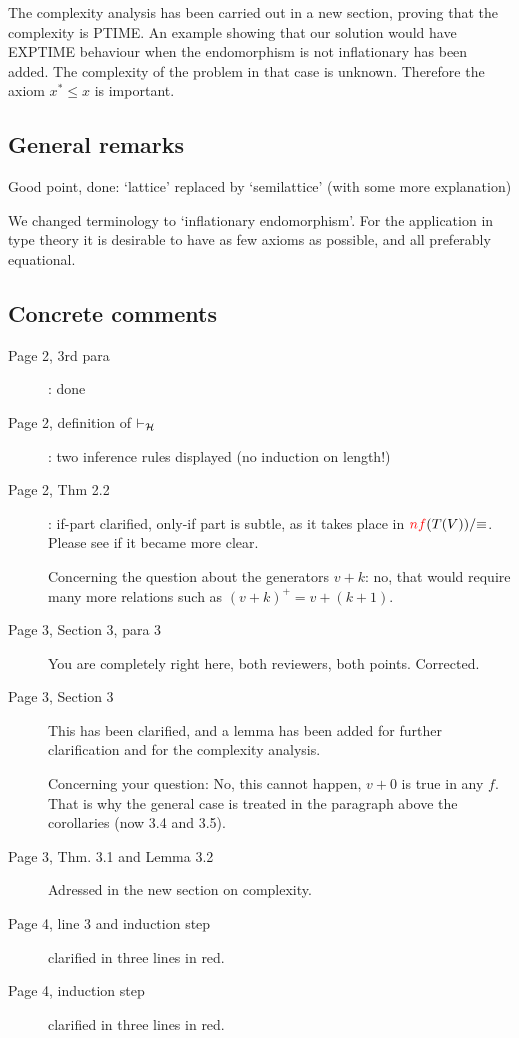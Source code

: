 \documentclass[11pt,a4paper]{article}
\newcommand\prvH{\vdash_{\cal H}}
\newcommand{\FYI}[1]{{\color{red}#1}}
\begin{document}
The complexity analysis has been carried out in a new section,
proving that the complexity is PTIME. 
An example showing that our solution would have EXPTIME behaviour
when the endomorphism is not inflationary has been added.
The complexity of the problem in that case is unknown.
Therefore the axiom $x^*\leqslant x$ is important.

\subsection*{General remarks}

Good point, done: `lattice' replaced by `semilattice' (with some more explanation)

We changed terminology to `inflationary endomorphism'.
For the application in type theory it is desirable to have as
few axioms as possible, and all preferably equational.

\subsection*{Concrete comments}

\begin{description}
\item[Page 2, 3rd para]: done

\item[Page 2, definition of $\prvH$]: two inference rules displayed (no induction on length!)

\item[Page 2, Thm 2.2]: if-part clarified, only-if part is subtle, as it takes place
in $\FYI{nf}(T(V))/{\equiv}$. Please see if it became more clear. 

Concerning the question about the generators $v+k$: no, that would require many more
relations such as $(v+k)^+ = v+(k+1)$.

\item[Page 3, Section 3, para 3] You are completely right here, both reviewers, both points. Corrected.

\item[Page 3, Section 3] This has been clarified, and a lemma has been added for further
clarification and for the complexity analysis.

Concerning your question: No, this cannot happen, $v+0$ is true in any $f$. That is why
the general case is treated in the paragraph above the corollaries (now 3.4 and 3.5).

\item[Page 3, Thm. 3.1 and Lemma 3.2] Adressed in the new section on complexity.

\item[Page 4, line 3 and induction step] clarified in three lines in red. 

\item[Page 4, induction step] clarified in three lines in red. 

\end{description}
\end{document}
